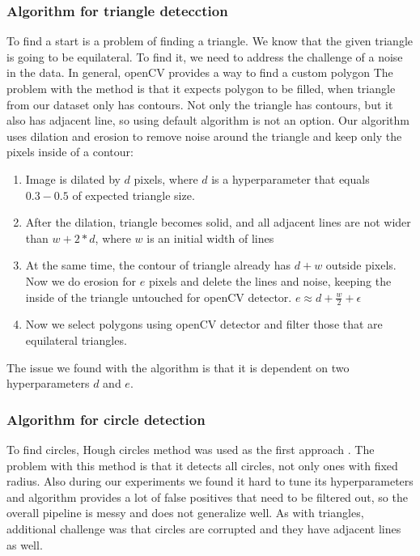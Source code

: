 \documentclass[a4paper,12pt]{extarticle}
\begin{document}
\subsubsection{Algorithm for triangle detecction}

To find a start is a problem of finding a triangle.
We know that the given triangle is going to be equilateral.
To find it, we need to address the challenge of a noise in the data.
In general, openCV provides a way to find a custom polygon \cite{contours}
The problem with the method is that it expects polygon to be filled, when triangle from our dataset only has contours.
Not only the triangle has contours, but it also has adjacent line, so using default algorithm is not an option.
Our algorithm uses dilation and erosion to remove noise around the triangle and keep only the pixels inside of a contour:
\begin{enumerate}
    \item Image is dilated by $d$ pixels, where $d$ is a hyperparameter that equals $0.3-0.5$ of expected triangle size.
    \item After the dilation, triangle becomes solid, and all adjacent lines are not wider than $w + 2 * d$, where $w$ is an initial width of lines
    \item At the same time, the contour of triangle already has $d + w$ outside pixels. Now we do erosion for $e$ pixels and delete the lines and noise, keeping the inside of the triangle untouched for openCV detector. $e \approx d + \frac{w}{2} + \epsilon$
    \item Now we select polygons using openCV detector and filter those that are equilateral triangles.
\end{enumerate}

The issue we found with the algorithm is that it is dependent on two hyperparameters $d$ and $e$.

\subsubsection{Algorithm for circle detection}

To find circles, Hough circles method was used as the first approach \cite{houghcircles}.
The problem with this method is that it detects all circles, not only ones with fixed radius.
Also during our experiments we found it hard to tune its hyperparameters and algorithm provides a lot of false positives that need to be filtered out, so the overall pipeline is messy and does not generalize well.
As with triangles, additional challenge was that circles are corrupted and they have adjacent lines as well.
\end{document}
